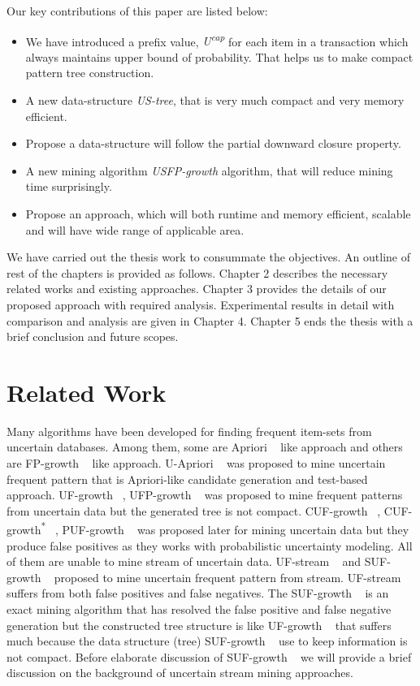 \documentclass[conference]{IEEEtran}
\begin{document}
Our key contributions of this paper are listed below:
\begin{itemize}
  \item We have introduced a prefix value, \emph{U\textsuperscript{cap}} for each item in a transaction which always maintains upper bound of probability. That helps us to make compact pattern tree construction.
  \item A new data-structure \emph{US-tree}, that is very much compact and very memory efficient.
  \item Propose a data-structure will follow the partial downward closure property.
  \item A new mining algorithm \emph{USFP-growth} algorithm, that will reduce mining time surprisingly.
  \item Propose an approach, which will both runtime and memory efficient, scalable and will have wide range of applicable area.
  \end{itemize}
We have carried out the thesis work to consummate the objectives. An outline of rest of the chapters is provided as follows. Chapter 2 describes the necessary related works and existing approaches. Chapter 3 provides the details of our proposed approach with required analysis. Experimental results in detail with comparison and analysis are given in Chapter 4. Chapter 5 ends the thesis with a brief conclusion and future scopes.

\section{Related Work}

Many algorithms have been developed for finding frequent item-sets from uncertain databases. Among them, some are Apriori ~\cite{apriori} like approach and others are FP-growth ~\cite{fp_growth} like approach. U-Apriori ~\cite{u_priori} was proposed to mine uncertain frequent pattern that is Apriori-like candidate generation and test-based approach. UF-growth ~\cite{uf_growth}, UFP-growth ~\cite{ufp_growth} was proposed to mine frequent patterns from uncertain data but the generated tree is not compact. CUF-growth ~\cite{cuf_growth}, CUF-growth\textsuperscript{*} ~\cite{cuf_growth}, PUF-growth ~\cite{puf_growth} was proposed later for mining uncertain data but they produce false positives as they works with probabilistic uncertainty modeling. All of them are unable to mine stream of uncertain data. UF-stream ~\cite{suf_growth} and SUF-growth ~\cite{suf_growth} proposed to mine uncertain frequent pattern from stream. UF-stream ~\cite{suf_growth} suffers from both false positives and false negatives. The SUF-growth ~\cite{suf_growth} is an exact mining algorithm that has resolved the false positive and false negative generation but the constructed tree structure is like UF-growth ~\cite{uf_growth} that suffers much because the data structure (tree) SUF-growth ~\cite{suf_growth} use to keep information is not compact. Before elaborate discussion of SUF-growth ~\cite{suf_growth} we will provide a brief discussion on the background of uncertain stream mining approaches.
\end{document}

